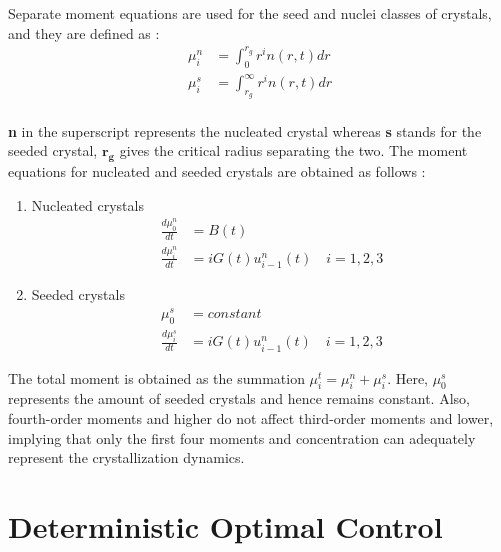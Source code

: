 \documentclass[3p,times]{elsarticle}
\begin{document}
Separate moment equations are used for the seed and nuclei classes of crystals, and they are defined as : \\
\begin{align}
\mu^{n}_{i} &= \int_{0}^{r_{g}} r^{i}n(r,t) dr \\
\mu^{s}_{i} &= \int_{r_{g}}^{\infty} r^{i}n(r,t) dr
\end{align} \\
\textbf{n} in the superscript represents the nucleated crystal whereas \textbf{s} stands for the seeded crystal, $\boldsymbol{r_{g}}$ gives the critical radius separating the two. The moment equations for nucleated and seeded crystals are obtained as follows\cite{yenkie} :

\begin{enumerate}

\item Nucleated crystals\cite{hu,paeng} 
\begin{align}
\frac{d\mu_{0}^{n}}{dt} &= B(t) \\
\frac{d\mu_{i}^{n}}{dt} &= iG(t)u_{i-1}^{n}(t) \quad  i = 1,2,3
\end{align}

\item Seeded crystals\cite{hu,paeng}
\begin{align}
\mu_{0}^{s} &= constant \\ \label{seed}
\frac{d\mu_{i}^{s}}{dt} &= iG(t)u_{i-1}^{n}(t) \quad  i = 1,2,3 
\end{align}
\end{enumerate}
The total moment is obtained as the summation $\mu_{i}^{t} = \mu_{i}^{n} + \mu_{i}^{s}$. Here, $\mu_{0}^{s}$ represents the amount of seeded crystals and hence remains constant. Also, fourth-order moments and higher do not affect third-order moments and lower, implying that only the first four moments and concentration can adequately represent the crystallization dynamics\cite{shi}. 



\section{Deterministic Optimal Control}
\end{document}
